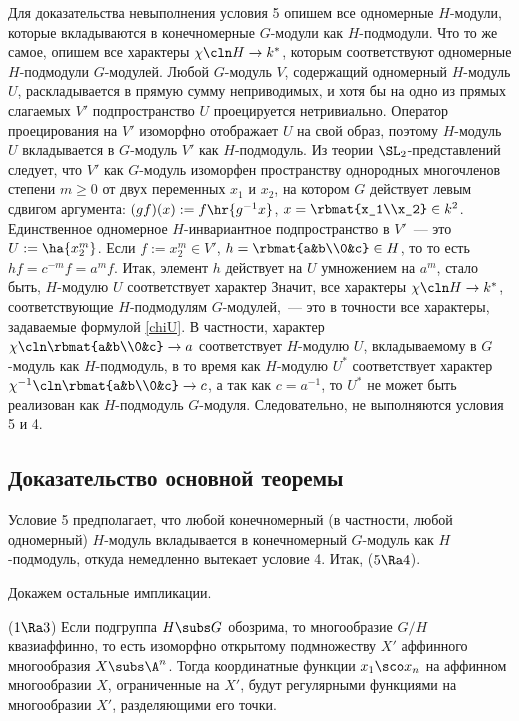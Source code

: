\documentclass{article}
\begin{document}
Для доказательства невыполнения условия 5 опишем все одномерные $H$-модули, которые вкладываются в конечномерные
$G$-модули как $H$-подмодули. Что то же самое, опишем все характеры $\chi\cln H\to k^*$, которым соответствуют
одномерные $H$-подмодули $G$-модулей. Любой $G$-модуль $V$, содержащий одномерный $H$-модуль $U$, раскладывается в
прямую сумму неприводимых, и хотя бы на одно из прямых слагаемых $V'$ подпространство $U$ проецируется
нетривиально. Оператор проецирования на $V'$ изоморфно отображает $U$ на свой образ, поэтому $H$-модуль $U$
вкладывается в $G$-модуль $V'$ как $H$-подмодуль. Из теории $\SL_2$-представлений следует, что $V'$ как $G$-модуль
изоморфен пространству однородных многочленов степени $m\ge0$ от двух переменных $x_1$ и $x_2$, на котором $G$
действует левым сдвигом аргумента: $(gf)(x):=f\hr{g^{-1}x}$, $x=\rbmat{x_1\\x_2}\in k^2$. Единственное одномерное
$H$-инвариантное подпространство в $V'$~--- это $U:=\ha{x_2^m}$. Если $f:=x_2^m\in V'$, $h=\rbmat{a&b\\0&c}\in H$,
то  то есть $hf=c^{-m}f=a^mf$. Итак, элемент $h$
действует на $U$ умножением на $a^m$, стало быть, $H$-модулю $U$ соответствует характер  Значит, все характеры $\chi\cln H\to k^*$, соответствующие $H$-подмодулям
$G$-модулей,~--- это в точности все характеры, задаваемые формулой \eqref{chiU}. В частности, характер
$\chi\cln\rbmat{a&b\\0&c}\to a$ соответствует $H$-модулю $U$, вкладываемому в $G$-модуль как $H$-подмодуль, в то
время как $H$-модулю $U^*$ соответствует характер $\chi^{-1}\cln\rbmat{a&b\\0&c}\to c$, а так как $c=a^{-1}$, то
$U^*$ не может быть реализован как $H$-подмодуль $G$-модуля. Следовательно, не выполняются условия 5 и 4.

\subsection{Доказательство основной теоремы}

Условие 5 предполагает, что любой конечномерный (в частности, любой одномерный) $H$-модуль вкладывается в
конечномерный $G$-модуль как $H$-подмодуль, откуда немедленно вытекает условие 4. Итак, ($5\Ra4$).

Докажем остальные импликации.

($1\Ra3$) Если подгруппа $H\subs G$ обозрима, то многообразие $G/H$ квазиаффинно, то есть изоморфно открытому
подмножеству $X'$ аффинного многообразия $X\subs\A^n$. Тогда координатные функции $x_1\sco x_n$ на аффинном
многообразии $X$, ограниченные на $X'$, будут регулярными функциями на многообразии $X'$, разделяющими его точки.
\end{document}
